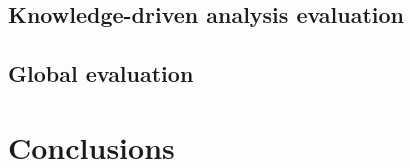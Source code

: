 \subsection{Knowledge-driven analysis evaluation} %
\label{sub:ex:knowledge_driven_analysis_evaluation}

\subsection{Global evaluation} %
\label{sub:ex:global_evaluation}





\section{Conclusions}
\label{sub:ex:conclusion}
